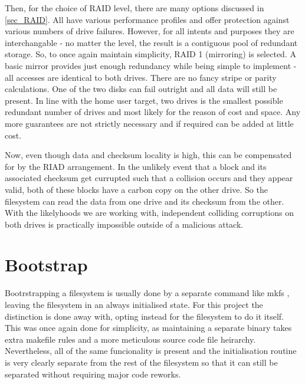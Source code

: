         Then, for the choice of RAID level, there are many options discussed in
        \ref{sec_RAID}. All have various performance profiles and offer
        protection against various numbers of drive failures. However, for all
        intents and purposes they are interchangable - no matter the level, the
        result is a contiguous pool of redundant storage. So, to once again
        maintain simplicity, RAID 1 (mirroring) is selected. A basic mirror
        provides just enough redundancy while being simple to implement - all
        accesses are identical to both drives. There are no fancy stripe or
        parity calculations. One of the two disks can fail outright and all
        data will still be present. In line with the home user target, two
        drives is the smallest possible redundant number of drives and most
        likely for the reason of cost and space. Any more guarantees are not
        strictly necessary and if required can be added at little cost.

        Now, even though data and checksum locality is high, this can be
        compensated for by the RIAD arrangement. In the unlikely event that a
        block and its associated checksum get currupted such that a collision
        occurs and they appear valid, both of these blocks have a carbon copy
        on the other drive. So the filesystem can read the data from one drive
        and its checksum from the other. With the likelyhoods we are working
        with, independent colliding corruptions on both drives is practically
        impossible outside of a malicious attack.

    \section{Bootstrap}

        Bootrstrapping a filesystem is usually done by a separate command like
        mkfs \cite{man_mkfs}, leaving the filesystem in an always initialised
        state. For this project the distinction is done away with, opting
        instead for the filesystem to do it itself. This was once again done
        for simplicity, as maintaining a separate binary takes extra makefile
        rules and a more meticulous source code file heirarchy. Nevertheless,
        all of the same funcionality is present and the initialisation routine
        is very clearly separate from the rest of the filesystem so that it can
        still be separated without requiring major code reworks.

